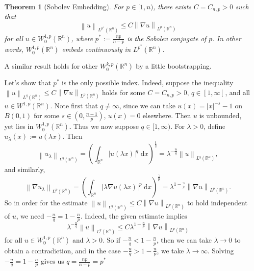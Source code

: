 \documentclass{book}
\newcommand{\bbR}{\mathbb{R}}
\renewcommand{\d}{\mathrm{d}}
\newcommand{\abs}[1]{\left\lvert {#1} \right\rvert}
\newcommand{\norm}[1]{\left\lVert {#1} \right\rVert}
\newcommand{\parens}[1]{\left( {#1} \right)}
\newtheorem{theorem}{Theorem}[chapter]
\theoremstyle{definition}
\numberwithin{equation}{chapter}
\begin{document}
\begin{theorem}[Sobolev Embedding]
    For $p \in [1,n)$, there exists $C = C_{n,p} > 0$ such that
    \begin{equation}
        \norm{u}_{L^{p^*}(\bbR^n)} \leq C \norm{\nabla u}_{L^p(\bbR^n)}
    \end{equation}
    for all $u \in W^{1,p}_0(\bbR^n)$, where $p^* := \frac{np}{n-p}$ is the \textit{Sobolev conjugate} of $p$. In other words, $W^{1,p}_0(\bbR^n)$ embeds continuously in $L^{p^*}(\bbR^n)$.
\end{theorem}
A similar result holds for other $W^{k,p}_0(\bbR^n)$ by a little bootstrapping.

Let's show that $p^*$ is the only possible index. Indeed, suppose the inequality $\norm{u}_{L^q(\bbR^n)} \leq C\norm{\nabla u}_{L^p(\bbR^n)}$ holds for some $C = C_{n,p} > 0$, $q \in [1,\infty]$, and all $u \in W^{1,p}(\bbR^n)$. Note first that $q \neq \infty$, since we can take $u(x) = \abs{x}^{-s} - 1$ on $B(0,1)$ for some $s \in (0,\frac{n-1}{p})$, $u(x) = 0$ elsewhere. Then $u$ is unbounded, yet lies in $W^{1,p}_0(\bbR^n)$. Thus we now suppose $q \in [1,\infty)$. For $\lambda > 0$, define $u_\lambda(x) := u(\lambda x)$. Then 
\begin{equation}
    \norm{u_\lambda}_{L^q(\bbR^n)} 
    = \parens{ \int_{\bbR^n} \abs{u(\lambda x)}^q \; \d{x} }^\frac{1}{q}
    = \lambda^{-\frac{n}{q}} \norm{u}_{L^q(\bbR^n)},
\end{equation}
and similarly,
\begin{equation}
    \norm{\nabla u_\lambda}_{L^p(\bbR^n)}
    = \parens{ \int_{\bbR^n} \abs{\lambda \nabla u(\lambda x)}^p \; \d{x} }^\frac{1}{p}
    = \lambda^{1 - \frac{n}{p}} \norm{\nabla u}_{L^p(\bbR^n)}.
\end{equation}
So in order for the estimate $\norm{u}_{L^q(\bbR^n)} \leq C \norm{\nabla u}_{L^p(\bbR^n)}$ to hold independent of $u$, we need $- \frac{n}{q} = 1 - \frac{n}{p}$. Indeed, the given estimate implies 
\begin{equation}
    \lambda^{-\frac{n}{q}} \norm{u}_{L^q(\bbR^n)} \leq C \lambda^{1 - \frac{n}{p}} \norm{\nabla u}_{L^p(\bbR^n)}
\end{equation}
for all $u \in W^{1,p}_0(\bbR^n)$ and $\lambda > 0$. So if $- \frac{n}{q} < 1 - \frac{n}{p}$, then we can take $\lambda \to 0$ to obtain a contradiction, and in the case $- \frac{n}{q} > 1 - \frac{n}{p}$, we take $\lambda \to \infty$. Solving $- \frac{n}{q} = 1 - \frac{n}{p}$ gives us $q = \frac{np}{n-p} = p^*$
 
\end{document}
